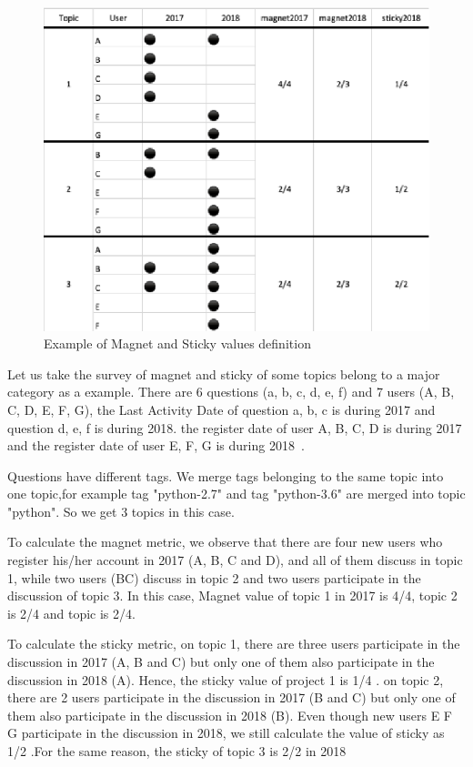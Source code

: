 \documentclass[conference]{IEEEtran}
\begin{document}
\begin{figure}[t]
 \centering
 \includegraphics[width=.9\hsize]{img/ex.eps}  
 \caption{Example of Magnet and Sticky values definition} 
 \label{fig:example2} 
\end{figure}
\smallskip
\smallskip

Let us take the survey of magnet and sticky of some topics belong to a major category as a example. There are 6 questions (a, b, c, d, e, f) and 7 users (A, B, C, D, E, F, G), the Last Activity Date of question a, b, c is during 2017 and question d, e, f is during 2018. the register date of user A, B, C, D is during 2017 and the register date of user E, F, G is during 2018~\cite{yamashita2016magnet}.

Questions have different tags. We merge tags belonging to the same topic into one topic,for example tag "python-2.7" and tag "python-3.6" are merged into topic "python". So we get 3 topics in this case.

To calculate the magnet metric, we observe that there are four new users who register his/her account in 2017 (A, B, C and D), and all of them discuss in topic 1, while two users (BC) discuss in topic 2 and two users participate in the discussion of topic 3. In this case, Magnet value of topic 1 in 2017 is 4/4, topic 2 is 2/4 and topic is 2/4.

To calculate the sticky metric, on topic 1, there are three users participate in the discussion in 2017 (A, B and C) but only one of them also participate in the discussion in 2018 (A). Hence, the sticky value of project 1 is 1/4 . on topic 2, there are 2 users participate in the discussion in 2017 (B and C) but only one of them also participate in the discussion in 2018 (B). Even though new users E F G participate in the discussion in 2018, we still calculate the value of sticky as 1/2 .For the same reason, the sticky of topic 3 is 2/2 in {2018}
\end{document}
